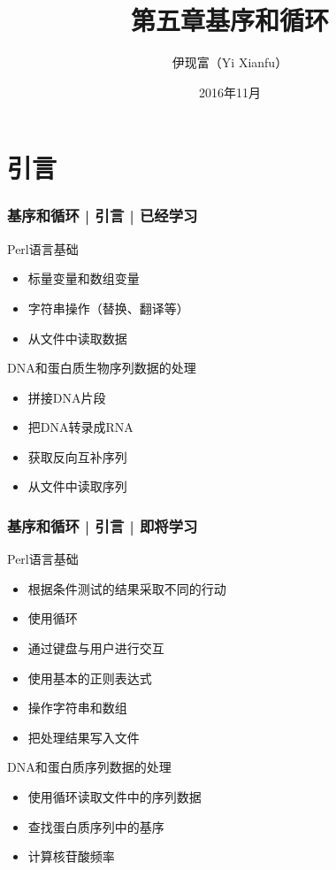 


\title[基序和循环]{第五章\quad 基序和循环}
\author[Yixf]{伊现富（Yi Xianfu）}
\date{2016年11月}




\section{引言}
\begin{frame}
  \frametitle{基序和循环 | 引言 | 已经学习}
  \begin{block}{Perl语言基础}
    \begin{itemize}
      \item 标量变量和数组变量
      \item 字符串操作（替换、翻译等）
      \item 从文件中读取数据
    \end{itemize}
  \end{block}
  \pause
  \begin{block}{DNA和蛋白质生物序列数据的处理}
    \begin{itemize}
      \item 拼接DNA片段
      \item 把DNA转录成RNA
      \item 获取反向互补序列
      \item 从文件中读取序列
    \end{itemize}
  \end{block}
\end{frame}
\begin{frame}
  \frametitle{基序和循环 | 引言 | 即将学习}
  \begin{block}{Perl语言基础}
    \begin{itemize}
      \item 根据条件测试的结果采取不同的行动
      \item 使用循环
      \item 通过键盘与用户进行交互
      \item 使用基本的正则表达式
      \item 操作字符串和数组
      \item 把处理结果写入文件
    \end{itemize}
  \end{block}
  \pause
  \begin{block}{DNA和蛋白质序列数据的处理}
    \begin{itemize}
      \item 使用循环读取文件中的序列数据
      \item 查找蛋白质序列中的基序
      \item 计算核苷酸频率
    \end{itemize}
  \end{block}
\end{frame}


